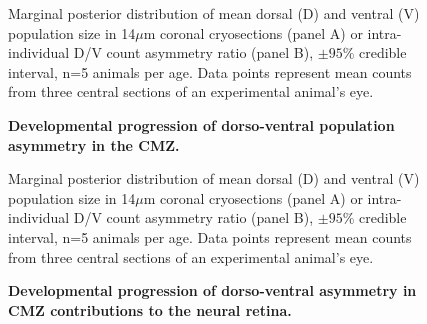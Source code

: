 \begin{figure}[!h]
    \caption{{\bf Developmental progression of dorso-ventral population asymmetry in the CMZ.}}
    Marginal posterior distribution of mean dorsal (D) and ventral (V) population size in 14$\mu$m coronal cryosections (panel A) or intra-individual D/V count asymmetry ratio (panel B), $\pm 95\%$ credible interval, n=5 animals per age. Data points represent mean counts from three central sections of an experimental animal's eye. 
    \label{DVontology}
\end{figure}

\begin{figure}[!h]
    \caption{{\bf Developmental progression of dorso-ventral asymmetry in CMZ contributions to the neural retina.}}
    Marginal posterior distribution of mean dorsal (D) and ventral (V) population size in 14$\mu$m coronal cryosections (panel A) or intra-individual D/V count asymmetry ratio (panel B), $\pm 95\%$ credible interval, n=5 animals per age. Data points represent mean counts from three central sections of an experimental animal's eye. 
    \label{DVcontribution}
\end{figure}


